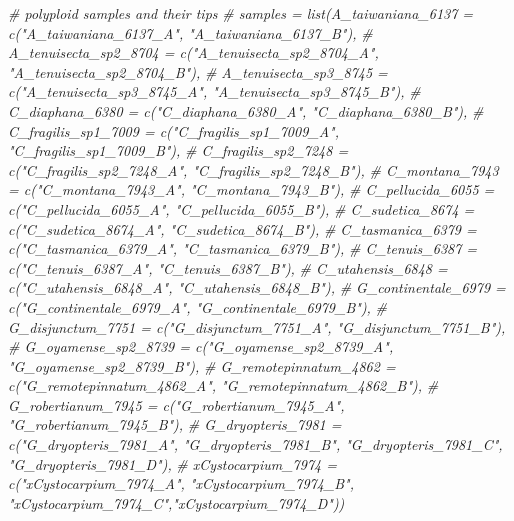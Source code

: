 \documentclass[
]{book}
\newenvironment{Shaded}{\begin{snugshade}}{\end{snugshade}}
\newcommand{\CommentTok}[1]{\textcolor[rgb]{0.56,0.35,0.01}{\textit{#1}}}
\begin{document}
\begin{Shaded}
\begin{Highlighting}[]
\CommentTok{\# polyploid samples and their tips}
\CommentTok{\# samples = list(\textquotesingle{}A\_taiwaniana\_6137\textquotesingle{} = c("A\_taiwaniana\_6137\_A", "A\_taiwaniana\_6137\_B"),}
\CommentTok{\#                \textquotesingle{}A\_tenuisecta\_sp2\_8704\textquotesingle{} = c("A\_tenuisecta\_sp2\_8704\_A", "A\_tenuisecta\_sp2\_8704\_B"),}
\CommentTok{\#                \textquotesingle{}A\_tenuisecta\_sp3\_8745\textquotesingle{} = c("A\_tenuisecta\_sp3\_8745\_A", "A\_tenuisecta\_sp3\_8745\_B"),}
\CommentTok{\#                \textquotesingle{}C\_diaphana\_6380\textquotesingle{} = c("C\_diaphana\_6380\_A", "C\_diaphana\_6380\_B"),}
\CommentTok{\#                \textquotesingle{}C\_fragilis\_sp1\_7009\textquotesingle{} = c("C\_fragilis\_sp1\_7009\_A", "C\_fragilis\_sp1\_7009\_B"),}
\CommentTok{\#                \textquotesingle{}C\_fragilis\_sp2\_7248\textquotesingle{} = c("C\_fragilis\_sp2\_7248\_A", "C\_fragilis\_sp2\_7248\_B"),}
\CommentTok{\#                \textquotesingle{}C\_montana\_7943\textquotesingle{} = c("C\_montana\_7943\_A", "C\_montana\_7943\_B"),}
\CommentTok{\#                \textquotesingle{}C\_pellucida\_6055\textquotesingle{}  = c("C\_pellucida\_6055\_A", "C\_pellucida\_6055\_B"),}
\CommentTok{\#                \textquotesingle{}C\_sudetica\_8674\textquotesingle{} = c("C\_sudetica\_8674\_A", "C\_sudetica\_8674\_B"),}
\CommentTok{\#                \textquotesingle{}C\_tasmanica\_6379\textquotesingle{} = c("C\_tasmanica\_6379\_A", "C\_tasmanica\_6379\_B"),}
\CommentTok{\#                \textquotesingle{}C\_tenuis\_6387\textquotesingle{} = c("C\_tenuis\_6387\_A", "C\_tenuis\_6387\_B"),}
\CommentTok{\#                \textquotesingle{}C\_utahensis\_6848\textquotesingle{} = c("C\_utahensis\_6848\_A", "C\_utahensis\_6848\_B"),}
\CommentTok{\#                \textquotesingle{}G\_continentale\_6979\textquotesingle{} = c("G\_continentale\_6979\_A", "G\_continentale\_6979\_B"),}
\CommentTok{\#                \textquotesingle{}G\_disjunctum\_7751\textquotesingle{} = c("G\_disjunctum\_7751\_A", "G\_disjunctum\_7751\_B"),}
\CommentTok{\#                \textquotesingle{}G\_oyamense\_sp2\_8739\textquotesingle{} = c("G\_oyamense\_sp2\_8739\_A", "G\_oyamense\_sp2\_8739\_B"),}
\CommentTok{\#                \textquotesingle{}G\_remotepinnatum\_4862\textquotesingle{} = c("G\_remotepinnatum\_4862\_A", "G\_remotepinnatum\_4862\_B"),}
\CommentTok{\#                \textquotesingle{}G\_robertianum\_7945\textquotesingle{} = c("G\_robertianum\_7945\_A", "G\_robertianum\_7945\_B"),}
\CommentTok{\#                \textquotesingle{}G\_dryopteris\_7981\textquotesingle{} = c("G\_dryopteris\_7981\_A", "G\_dryopteris\_7981\_B", "G\_dryopteris\_7981\_C", "G\_dryopteris\_7981\_D"),}
\CommentTok{\#                \textquotesingle{}xCystocarpium\_7974\textquotesingle{} = c("xCystocarpium\_7974\_A", "xCystocarpium\_7974\_B", "xCystocarpium\_7974\_C","xCystocarpium\_7974\_D"))}



\end{Highlighting}
\end{Shaded}
\end{document}
